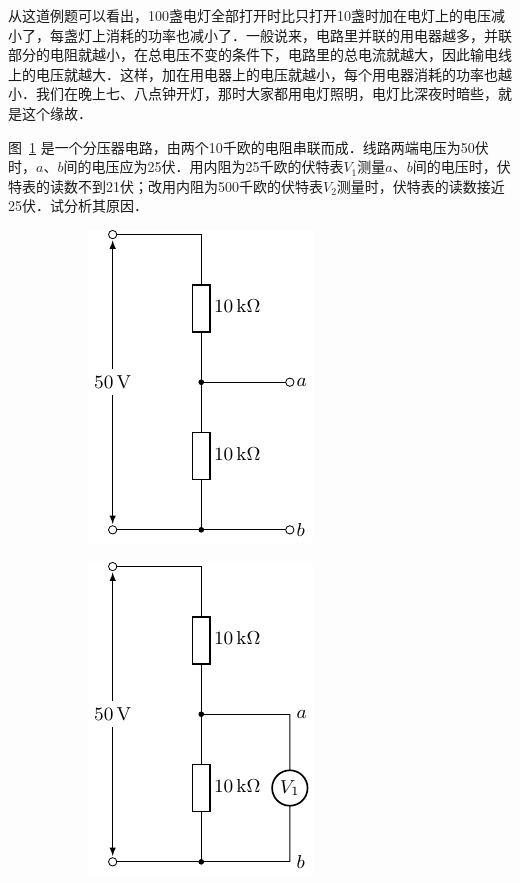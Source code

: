 从这道例题可以看出，100盏电灯全部打开时比只打开10盏时加在电灯上的电压减小了，每盏灯上消耗的功率也减小了．一般说来，电路里并联的用电器越多，并联部分的电阻就越小，在总电压不变的条件下，电路里的总电流就越大，因此输电线上的电压就越大．这样，加在用电器上的电压就越小，每个用电器消耗的功率也越小．我们在晚上七、八点钟开灯，那时大家都用电灯照明，电灯比深夜时暗些，就是这个缘故．

\begin{example}
图~\ref{fig_B_7-20a} 是一个分压器电路，由两个10千欧的电阻串联而成．线路两端电压为50伏时，$a$、$b$间的电压应为25伏．用内阻为25千欧的伏特表$V_1$测量$a$、$b$间的电压时，伏特表的读数不到21伏；改用内阻为500千欧的伏特表$V_2$测量时，伏特表的读数接近25伏．试分析其原因．
\end{example}
\begin{figure}[htbp]
    \centering
    \begin{subfigure}{0.3\linewidth}
        \centering
        \includegraphics{fig/B/7-20a.pdf}
        \caption{}\label{fig_B_7-20a}
    \end{subfigure}
    \hfil
    \begin{subfigure}{0.3\linewidth}
        \centering
        \includegraphics{fig/B/7-20b.pdf}

\end{subfigure}
\end{figure}
